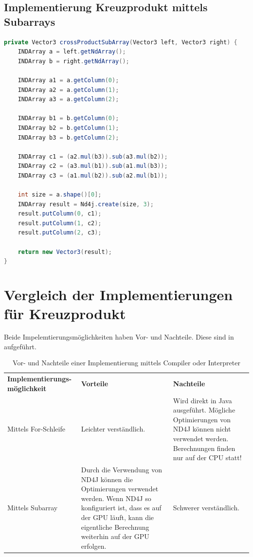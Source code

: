 \subsection{Implementierung Kreuzprodukt mittels Subarrays}
\begin{minipage}{\linewidth}
\begin{lstlisting}[language=java, label={lst:Kreuzprodukt_Subarray}, caption={Implementierung Kreuzprodukt mittels for-Schleife}, captionpos=b]
private Vector3 crossProductSubArray(Vector3 left, Vector3 right) {
    INDArray a = left.getNdArray();
    INDArray b = right.getNdArray();

    INDArray a1 = a.getColumn(0);
    INDArray a2 = a.getColumn(1);
    INDArray a3 = a.getColumn(2);

    INDArray b1 = b.getColumn(0);
    INDArray b2 = b.getColumn(1);
    INDArray b3 = b.getColumn(2);

    INDArray c1 = (a2.mul(b3)).sub(a3.mul(b2));
    INDArray c2 = (a3.mul(b1)).sub(a1.mul(b3));
    INDArray c3 = (a1.mul(b2)).sub(a2.mul(b1));

    int size = a.shape()[0];
    INDArray result = Nd4j.create(size, 3);
    result.putColumn(0, c1);
    result.putColumn(1, c2);
    result.putColumn(2, c3);

    return new Vector3(result);
}
\end{lstlisting}
\end{minipage}

\section{Vergleich der Implementierungen für Kreuzprodukt}
Beide Impelemtierungsmöglichkeiten haben Vor- und Nachteile.
Diese sind in  aufgeführt.
\begin{table}[H]
	\centering
	\begin{tabular}{ | p{4cm} | p{5.5cm} | p{5.5cm} | }
		\hline \rowcolor{gray!15}
		\textbf{Implementierungs-möglichkeit} & \textbf{Vorteile} & \textbf{Nachteile} \\ \hhline{|=|=|=|}
		Mittels For-Schleife & Leichter verständlich. & Wird direkt in Java ausgeführt. \newline Mögliche Optimierungen von ND4J können nicht verwendet werden. Berechnungen finden nur auf der \ac{CPU} statt! \\ \hline
		Mittels Subarray & Durch die Verwendung von ND4J können die Optimierungen verwendet werden. Wenn ND4J so konfiguriert ist, dass es auf der \ac{GPU} läuft, kann die eigentliche Berechnung weiterhin auf der \ac{GPU} erfolgen. & Schwerer verständlich. \\ \hline
	\end{tabular}
	\caption{Vor- und Nachteile einer Implementierung mittels Compiler oder Interpreter}
	\label{tab:Vorteile_Kreuzprodukt_Implementierungen}
\end{table}

